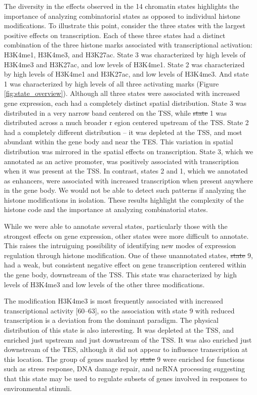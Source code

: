 \documentclass[10pt,letterpaper]{article}
\providecommand{\DIFaddtex}[1]{{\protect\color{blue}\uwave{#1}}} %
\providecommand{\DIFdeltex}[1]{{\protect\color{red}\sout{#1}}}                      %
\providecommand{\DIFaddbegin}{} %
\providecommand{\DIFaddend}{} %
\providecommand{\DIFdelbegin}{} %
\providecommand{\DIFdelend}{} %
\providecommand{\DIFadd}[1]{\texorpdfstring{\DIFaddtex{#1}}{#1}} %
\providecommand{\DIFdel}[1]{\texorpdfstring{\DIFdeltex{#1}}{}} %
\newcommand{\DIFscaledelfig}{0.5}
\newlength{\DIFdelgraphicswidth} %
\newlength{\DIFdelgraphicsheight} %
\newcommand{\DIFaddincludegraphics}[2][]{{\color{blue}\fbox{\DIFOincludegraphics[#1]{#2}}}} %
\newcommand{\DIFdelincludegraphics}[2][]{%
\sbox{\DIFdelgraphicsbox}{\DIFOincludegraphics[#1]{#2}}%
\settoboxwidth{\DIFdelgraphicswidth}{\DIFdelgraphicsbox} %
\settoboxtotalheight{\DIFdelgraphicsheight}{\DIFdelgraphicsbox} %
\scalebox{\DIFscaledelfig}{%
\parbox[b]{\DIFdelgraphicswidth}{\usebox{\DIFdelgraphicsbox}\\[-\baselineskip] \rule{\DIFdelgraphicswidth}{0em}}\llap{\resizebox{\DIFdelgraphicswidth}{\DIFdelgraphicsheight}{%
\setlength{\unitlength}{\DIFdelgraphicswidth}%
\begin{picture}(1,1)%
\thicklines\linethickness{2pt} %
{\color[rgb]{1,0,0}\put(0,0){\framebox(1,1){}}}%
{\color[rgb]{1,0,0}\put(0,0){\line( 1,1){1}}}%
{\color[rgb]{1,0,0}\put(0,1){\line(1,-1){1}}}%
\end{picture}%
}\hspace*{3pt}}} %
} %
\DeclareRobustCommand{\DIFaddbegin}{\DIFOaddbegin \let\includegraphics\DIFaddincludegraphics} %
\DeclareRobustCommand{\DIFaddend}{\DIFOaddend \let\includegraphics\DIFOincludegraphics} %
\DeclareRobustCommand{\DIFdelbegin}{\DIFOdelbegin \let\includegraphics\DIFdelincludegraphics} %
\DeclareRobustCommand{\DIFdelend}{\DIFOaddend \let\includegraphics\DIFOincludegraphics} %
\begin{document}
The diversity in the effects observed in the 14 chromatin states
highlights the importance of analyzing combinatorial states as opposed
to individual histone modifications. To illustrate this point, consider
the three states with the largest positive effects on transcription.
Each of these three states had a distinct combination of the three
histone marks associated with transcriptional activation: H3K4me1,
H3K4me3, and H3K27ac. State 3 was characterized by high levels of
H3K4me3 and H3K27ac, and low levels of H3K4me1. State 2 was
characterized by high levels of H3K4me1 and H3K27ac, and low levels of
H3K4me3. And state 1 was characterized by high levels of all three
activating marks (Figure \ref{fig:state_overview}). Although all three
states were associated with increased gene expression, each had a
completely distinct spatial distribution. State 3 was distributed in a
very narrow band centered on the TSS, while \DIFdelbegin \DIFdel{state }\DIFdelend \DIFaddbegin \DIFadd{State }\DIFaddend 1 was distributed
across a much broader r egion centered upstream of the TSS. State 2 had
a completely different distribution -- it was depleted at the TSS, and
most abundant within the gene body and near the TES. This variation in
spatial distribution was mirrored in the spatial effects on
transcription. State 3, which we annotated as an active promoter, was
positively associated with transcription when it was present at the TSS.
In contrast, states 2 and 1, which we annotated as enhancers, were
associated with increased transcription when present anywhere in the
gene body. We would not be able to detect such patterns if analyzing the
histone modifications in isolation. These results highlight the
complexity of the histone code and the importance at analyzing
combinatorial states.

While we were able to annotate several states, particularly those with
the strongest effects on gene expression, other states were more
difficult to annotate. This raises the intruiguing possibility of
identifying new modes of expression regulation through histone
modification. One of these unannotated states, \DIFdelbegin \DIFdel{state }\DIFdelend \DIFaddbegin \DIFadd{State }\DIFaddend 9, had a weak, but
consistent negative effect on gene transcription centered within the
gene body, downstream of the TSS. This state was characterized by high
levels of H3K4me3 and low levels of the other three modifications.

The modification H3K4me3 is most frequently associated with increased
transcriptional activity {[}60--63{]}, so the association with state 9
with reduced transcription is a deviation from the dominant paradigm.
The physical distribution of this state is also interesting. It was
depleted at the TSS, and enriched just upstream and just downstream of
the TSS. It was also enriched just downstream of the TES, although it
did not appear to influence transcription at this location. The group of
genes marked by \DIFdelbegin \DIFdel{state }\DIFdelend \DIFaddbegin \DIFadd{State }\DIFaddend 9 were enriched for functions such as stress
response, DNA damage repair, and ncRNA processing suggesting that this
state may be used to regulate subsets of genes involved in responses to
environmental stimuli.
\end{document}
